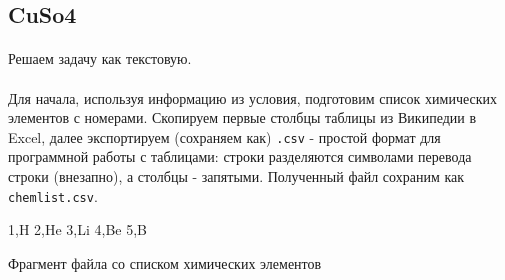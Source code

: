 \documentclass[12pt]{article}
\begin{document}
%
%
%

    \subsection{CuSo4}
    \paragraph{}
    Решаем задачу как текстовую.
    \paragraph{}
    Для начала, используя информацию из условия, подготовим список химических элементов с номерами.
    Скопируем первые столбцы таблицы из Википедии в Excel, далее экспортируем (сохраняем как) \verb|.csv| -
    простой формат для программной работы с таблицами: строки разделяются символами перевода строки (внезапно),
    а столбцы - запятыми.
    Полученный файл сохраним как \verb|chemlist.csv|.
    \begin{listing}[H]
        \begin{pythoncode}
1,H
2,He
3,Li
4,Be
5,B
        \end{pythoncode}
        \caption{Фрагмент файла со списком химических элементов}
        \label{lst:chemlist}
    \end{listing}
\end{document}
